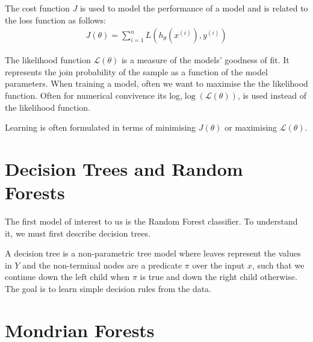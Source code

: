 \begin{definition}
    The cost function $J$ is used to model the performance of a model and is
    related to the loss function as follows:
    \begin{align}
        J(\theta) = \sum_{i=1}^{n}L(h_{\theta}(x^{(i)}), y^{(i)})
    \end{align}
\end{definition}

\begin{definition}
    The likelihood function $\mathcal{L}(\theta)$ is a measure of the models'
    goodness of fit. It represents the join probability of the sample as a
    function of the model parameters. When training a model, often we want to
    maximise the the likelihood function. Often for numerical convivence its
    log,\ie $\log(\mathcal{L}(\theta))$, is used instead of the likelihood
    function.
\end{definition}

\noindent Learning is often formulated in terms of minimising $J(\theta)$ or
maximising $\mathcal{L}(\theta)$.

\section{Decision Trees and Random Forests}
\label{appendix:supervised:randomforests}

The first model of interest to us is the Random Forest classifier. To understand it, we must first describe decision trees.

\begin{definition}
    A decision tree is a non-parametric tree model where leaves represent the
    values in $Y$ and the non-terminal nodes are a predicate $\pi$ over the
    input $x$, such that we continue down the left child when $\pi$ is true and
    down the right child otherwise. The goal is to learn simple decision rules
    from the data.
\end{definition}

\section{Mondrian Forests}
\label{appendix:supervised:mondrian}

